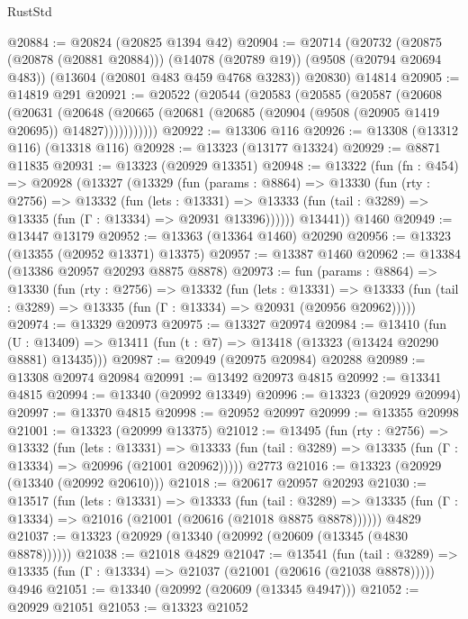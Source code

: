 \begin{lexlean}{RustStd}
\begin{coremodule}
@20884 := @20824 (@20825 @1394 @42)
@20904 := @20714
    (@20732
      (@20875 (@20878 (@20881 @20884)))
      (@14078 (@20789 @19))
      (@9508 (@20794 @20694 @483))
      (@13604 (@20801 @483 @459 @4768 @3283))
      @20830)
    @14814
@20905 := @14819 @291
@20921 := @20522
    (@20544
      (@20583
        (@20585
          (@20587
            (@20608
              (@20631
                (@20648
                  (@20665 (@20681 (@20685 (@20904 (@9508 (@20905 @1419 @20695)) @14827)))))))))))
@20922 := @13306 @116
@20926 := @13308 (@13312 @116) (@13318 @116)
@20928 := @13323 (@13177 @13324)
@20929 := @8871 @11835
@20931 := @13323 (@20929 @13351)
@20948 := @13322
    (fun (fn : @454) =>
    @20928
      (@13327
        (@13329
          (fun (params : @8864) =>
          @13330
            (fun (rty : @2756) =>
            @13332
              (fun (lets : @13331) =>
              @13333 (fun (tail : @3289) => @13335 (fun (Γ : @13334) => @20931 @13396))))))
        @13441))
    @1460
@20949 := @13447 @13179
@20952 := @13363 (@13364 @1460) @20290
@20956 := @13323 (@13355 (@20952 @13371) @13375)
@20957 := @13387 @1460
@20962 := @13384 (@13386 @20957 @20293 @8875 @8878)
@20973 := fun (params : @8864) =>
  @13330
    (fun (rty : @2756) =>
    @13332
      (fun (lets : @13331) =>
      @13333 (fun (tail : @3289) => @13335 (fun (Γ : @13334) => @20931 (@20956 @20962)))))
@20974 := @13329 @20973
@20975 := @13327 @20974
@20984 := @13410
    (fun (U : @13409) => @13411 (fun (t : @7) => @13418 (@13323 (@13424 @20290 @8881) @13435)))
@20987 := @20949 (@20975 @20984) @20288
@20989 := @13308 @20974 @20984
@20991 := @13492 @20973 @4815
@20992 := @13341 @4815
@20994 := @13340 (@20992 @13349)
@20996 := @13323 (@20929 @20994)
@20997 := @13370 @4815
@20998 := @20952 @20997
@20999 := @13355 @20998
@21001 := @13323 (@20999 @13375)
@21012 := @13495
    (fun (rty : @2756) =>
    @13332
      (fun (lets : @13331) =>
      @13333 (fun (tail : @3289) => @13335 (fun (Γ : @13334) => @20996 (@21001 @20962)))))
    @2773
@21016 := @13323 (@20929 (@13340 (@20992 @20610)))
@21018 := @20617 @20957 @20293
@21030 := @13517
    (fun (lets : @13331) =>
    @13333
      (fun (tail : @3289) =>
      @13335 (fun (Γ : @13334) => @21016 (@21001 (@20616 (@21018 @8875 @8878))))))
    @4829
@21037 := @13323 (@20929 (@13340 (@20992 (@20609 (@13345 (@4830 @8878))))))
@21038 := @21018 @4829
@21047 := @13541
    (fun (tail : @3289) => @13335 (fun (Γ : @13334) => @21037 (@21001 (@20616 (@21038 @8878)))))
    @4946
@21051 := @13340 (@20992 (@20609 (@13345 @4947)))
@21052 := @20929 @21051
@21053 := @13323 @21052

\end{coremodule}
\end{lexlean}
